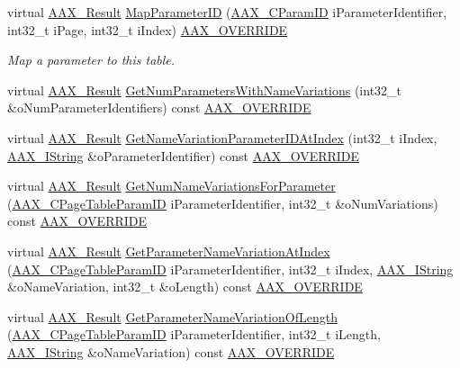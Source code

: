 \begin{DoxyCompactItemize}
virtual \hyperlink{a00149_a4d8f69a697df7f70c3a8e9b8ee130d2f}{A\+A\+X\+\_\+\+Result} \hyperlink{a00138_a835ed38dc26d6823a5b4413c97b64645}{Map\+Parameter\+I\+D} (\hyperlink{a00149_a1440c756fe5cb158b78193b2fc1780d1}{A\+A\+X\+\_\+\+C\+Param\+I\+D} i\+Parameter\+Identifier, int32\+\_\+t i\+Page, int32\+\_\+t i\+Index) \hyperlink{a00149_ac2f24a5172689ae684344abdcce55463}{A\+A\+X\+\_\+\+O\+V\+E\+R\+R\+I\+D\+E}
\begin{DoxyCompactList}\small\item\em Map a parameter to this table. \end{DoxyCompactList}\item 
virtual \hyperlink{a00149_a4d8f69a697df7f70c3a8e9b8ee130d2f}{A\+A\+X\+\_\+\+Result} \hyperlink{a00138_a8a464190f87797104cf083146aca21c4}{Get\+Num\+Parameters\+With\+Name\+Variations} (int32\+\_\+t \&o\+Num\+Parameter\+Identifiers) const \hyperlink{a00149_ac2f24a5172689ae684344abdcce55463}{A\+A\+X\+\_\+\+O\+V\+E\+R\+R\+I\+D\+E}
\item 
virtual \hyperlink{a00149_a4d8f69a697df7f70c3a8e9b8ee130d2f}{A\+A\+X\+\_\+\+Result} \hyperlink{a00138_a614d4770121320a3f05aed2df519aa0f}{Get\+Name\+Variation\+Parameter\+I\+D\+At\+Index} (int32\+\_\+t i\+Index, \hyperlink{a00113}{A\+A\+X\+\_\+\+I\+String} \&o\+Parameter\+Identifier) const \hyperlink{a00149_ac2f24a5172689ae684344abdcce55463}{A\+A\+X\+\_\+\+O\+V\+E\+R\+R\+I\+D\+E}
\item 
virtual \hyperlink{a00149_a4d8f69a697df7f70c3a8e9b8ee130d2f}{A\+A\+X\+\_\+\+Result} \hyperlink{a00138_ae78c5289e22361ac68dc20d8c9d2ae39}{Get\+Num\+Name\+Variations\+For\+Parameter} (\hyperlink{a00149_ab4e01b971dac1b25632fd9f710dd8f77}{A\+A\+X\+\_\+\+C\+Page\+Table\+Param\+I\+D} i\+Parameter\+Identifier, int32\+\_\+t \&o\+Num\+Variations) const \hyperlink{a00149_ac2f24a5172689ae684344abdcce55463}{A\+A\+X\+\_\+\+O\+V\+E\+R\+R\+I\+D\+E}
\item 
virtual \hyperlink{a00149_a4d8f69a697df7f70c3a8e9b8ee130d2f}{A\+A\+X\+\_\+\+Result} \hyperlink{a00138_ace03c8cf21d7cadb1a65df8bd2969d77}{Get\+Parameter\+Name\+Variation\+At\+Index} (\hyperlink{a00149_ab4e01b971dac1b25632fd9f710dd8f77}{A\+A\+X\+\_\+\+C\+Page\+Table\+Param\+I\+D} i\+Parameter\+Identifier, int32\+\_\+t i\+Index, \hyperlink{a00113}{A\+A\+X\+\_\+\+I\+String} \&o\+Name\+Variation, int32\+\_\+t \&o\+Length) const \hyperlink{a00149_ac2f24a5172689ae684344abdcce55463}{A\+A\+X\+\_\+\+O\+V\+E\+R\+R\+I\+D\+E}
\item 
virtual \hyperlink{a00149_a4d8f69a697df7f70c3a8e9b8ee130d2f}{A\+A\+X\+\_\+\+Result} \hyperlink{a00138_af6e05bfc749add76b4b0c98bb689e953}{Get\+Parameter\+Name\+Variation\+Of\+Length} (\hyperlink{a00149_ab4e01b971dac1b25632fd9f710dd8f77}{A\+A\+X\+\_\+\+C\+Page\+Table\+Param\+I\+D} i\+Parameter\+Identifier, int32\+\_\+t i\+Length, \hyperlink{a00113}{A\+A\+X\+\_\+\+I\+String} \&o\+Name\+Variation) const \hyperlink{a00149_ac2f24a5172689ae684344abdcce55463}{A\+A\+X\+\_\+\+O\+V\+E\+R\+R\+I\+D\+E}

\end{DoxyCompactItemize}
